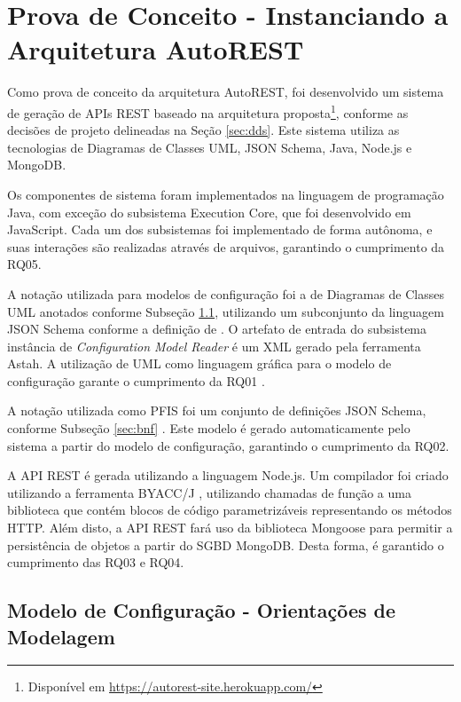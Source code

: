 
\section{Prova de Conceito - Instanciando a Arquitetura AutoREST}
\label{sec:conceptproof}

Como prova de conceito da arquitetura AutoREST, foi desenvolvido um sistema de geração de APIs REST baseado na arquitetura proposta\footnote{Disponível em \url{https://autorest-site.herokuapp.com/}}, conforme as decisões de projeto delineadas na Seção \ref{sec:dds}. Este sistema utiliza as tecnologias de Diagramas de Classes UML, JSON Schema, Java, Node.js e MongoDB.

Os componentes de sistema foram implementados na linguagem de programação Java, com exceção do subsistema Execution Core, que foi desenvolvido em JavaScript. Cada um dos subsistemas foi implementado de forma autônoma, e suas interações são realizadas através de arquivos, garantindo o cumprimento da RQ05.

A notação utilizada para modelos de configuração foi a de Diagramas de Classes UML anotados conforme Subseção \ref{sec:xmi}, utilizando um subconjunto da linguagem JSON Schema conforme a definição de . O artefato de entrada do subsistema instância de \textit{Configuration Model Reader} é um XML gerado pela ferramenta Astah. A utilização de UML como linguagem gráfica para o modelo de configuração garante o cumprimento da RQ01 \cite{OMG:2011}.

A notação utilizada como PFIS foi um conjunto de definições JSON Schema, conforme Subseção \ref{sec:bnf} \cite{PEZOA:2016}. Este modelo é gerado automaticamente pelo sistema a partir do modelo de configuração, garantindo o cumprimento da RQ02.

A API REST é gerada utilizando a linguagem Node.js. Um compilador foi criado utilizando a ferramenta BYACC/J \cite{BYACCJ}, utilizando chamadas de função a uma biblioteca que contém blocos de código parametrizáveis representando os métodos HTTP. Além disto, a API REST fará uso da biblioteca Mongoose para permitir a persistência de objetos a partir do SGBD MongoDB. Desta forma, é garantido o cumprimento das RQ03 e RQ04.


\subsection{Modelo de Configuração - Orientações de Modelagem}
\label{sec:xmi}

